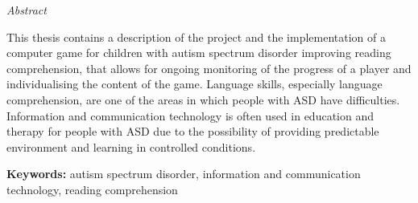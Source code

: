 {\centering\large
    {\Huge\emph{Abstract}\\}
    \vspace{0.5cm}
}

This thesis contains a description of the project and the implementation of a computer game for children with autism spectrum disorder improving reading comprehension, that allows for ongoing monitoring of the progress of a player and individualising the content of the game.
Language skills, especially language comprehension, are one of the areas in which people with ASD have difficulties.
Information and communication technology is often used in education and therapy for people with ASD due to the possibility of providing predictable environment and learning in controlled conditions.

\vspace{1cm}
\noindent\textbf{Keywords:}
autism spectrum disorder, information and communication technology, reading comprehension